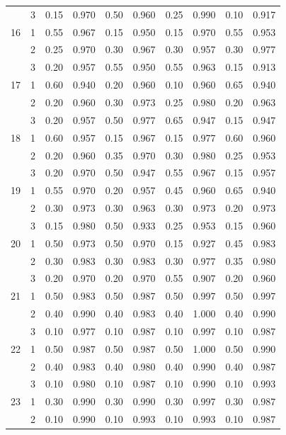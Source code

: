\begin{longtable}{llcccccccc}
   & 3 & 0.15 & 0.970 & 0.50 & 0.960 & 0.25 & 0.990 & 0.10 & 0.917 \\ 
  16 & 1 & 0.55 & 0.967 & 0.15 & 0.950 & 0.15 & 0.970 & 0.55 & 0.953 \\ 
   & 2 & 0.25 & 0.970 & 0.30 & 0.967 & 0.30 & 0.957 & 0.30 & 0.977 \\ 
   & 3 & 0.20 & 0.957 & 0.55 & 0.950 & 0.55 & 0.963 & 0.15 & 0.913 \\ 
  17 & 1 & 0.60 & 0.940 & 0.20 & 0.960 & 0.10 & 0.960 & 0.65 & 0.940 \\ 
   & 2 & 0.20 & 0.960 & 0.30 & 0.973 & 0.25 & 0.980 & 0.20 & 0.963 \\ 
   & 3 & 0.20 & 0.957 & 0.50 & 0.977 & 0.65 & 0.947 & 0.15 & 0.947 \\ 
  18 & 1 & 0.60 & 0.957 & 0.15 & 0.967 & 0.15 & 0.977 & 0.60 & 0.960 \\ 
   & 2 & 0.20 & 0.960 & 0.35 & 0.970 & 0.30 & 0.980 & 0.25 & 0.953 \\ 
   & 3 & 0.20 & 0.970 & 0.50 & 0.947 & 0.55 & 0.967 & 0.15 & 0.957 \\ 
  19 & 1 & 0.55 & 0.970 & 0.20 & 0.957 & 0.45 & 0.960 & 0.65 & 0.940 \\ 
   & 2 & 0.30 & 0.973 & 0.30 & 0.963 & 0.30 & 0.973 & 0.20 & 0.973 \\ 
   & 3 & 0.15 & 0.980 & 0.50 & 0.933 & 0.25 & 0.953 & 0.15 & 0.960 \\ 
  20 & 1 & 0.50 & 0.973 & 0.50 & 0.970 & 0.15 & 0.927 & 0.45 & 0.983 \\ 
   & 2 & 0.30 & 0.983 & 0.30 & 0.983 & 0.30 & 0.977 & 0.35 & 0.980 \\ 
   & 3 & 0.20 & 0.970 & 0.20 & 0.970 & 0.55 & 0.907 & 0.20 & 0.960 \\ 
  21 & 1 & 0.50 & 0.983 & 0.50 & 0.987 & 0.50 & 0.997 & 0.50 & 0.997 \\ 
   & 2 & 0.40 & 0.990 & 0.40 & 0.983 & 0.40 & 1.000 & 0.40 & 0.990 \\ 
   & 3 & 0.10 & 0.977 & 0.10 & 0.987 & 0.10 & 0.997 & 0.10 & 0.987 \\ 
  22 & 1 & 0.50 & 0.987 & 0.50 & 0.987 & 0.50 & 1.000 & 0.50 & 0.990 \\ 
   & 2 & 0.40 & 0.983 & 0.40 & 0.980 & 0.40 & 0.990 & 0.40 & 0.987 \\ 
   & 3 & 0.10 & 0.980 & 0.10 & 0.987 & 0.10 & 0.990 & 0.10 & 0.993 \\ 
  23 & 1 & 0.30 & 0.990 & 0.30 & 0.990 & 0.30 & 0.997 & 0.30 & 0.987 \\ 
   & 2 & 0.10 & 0.990 & 0.10 & 0.993 & 0.10 & 0.993 & 0.10 & 0.987 \\ 

\end{longtable}
